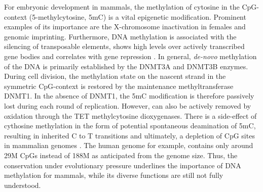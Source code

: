 For embryonic development in mammals, the methylation of cytosine in the CpG-context (5-methylcytosine, 5mC) is a vital epigenetic modification. Prominent examples of its importance are the X-chromosome inactivation in females and genomic imprinting.
Furthermore, DNA methylation is associated with the silencing of transposable elements, shows high levels over actively transcribed gene bodies and correlates with gene repression \cite{Greenberg2019}.
In general, \textit{de-novo} methylation of the DNA is primarily established by the DNMT3A and DNMT3B enzymes. 
During cell division, the methylation state on the nascent strand in the symmetric CpG-context is restored by the maintenance methyltransferase DNMT1.
In the absence of DNMT1, the 5mC modification is therefore passively lost during each round of replication. 
However, can also be actively removed by oxidation through the TET methylcytosine dioxygenases.
There is a side-effect of cythosine methylation in the form of potential spontaneous deamination of 5mC, resulting in inherited C to T transitions and ultimately, a depletion of CpG sites in mammalian genomes \cite{Holliday1993}. 
The human genome for example, contains only around 29M CpGs instead of 188M as anticipated from the genome size. 
Thus, the conservation under evolutionary pressure underlines the importance of DNA methylation for mammals, while its diverse functions are still not fully understood.


%
%


